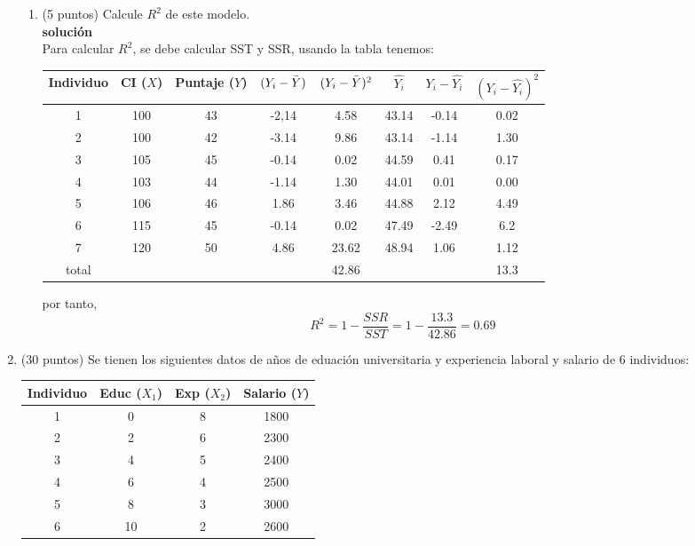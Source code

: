\documentclass[10pt,a4paper]{article}
\begin{document}
\begin{enumerate}
\begin{enumerate}
    \item (5 puntos) Calcule $R^2$ de este modelo.\\
    \textbf{solución}
    \\
    Para calcular $R^2$, se debe calcular SST y SSR, usando la tabla tenemos:
\begin{center}
\begin{tabular}{|c|c|c|c|c|c|c|c|}
\hline
\textbf{Individuo} & \textbf{CI} ($X$) & \textbf{Puntaje} ($Y$)  & $(Y_i - \Bar{Y})$ &$(Y_i - \Bar{Y})^2$ & $\hat{Y_i}$ & $Y_i-\hat{Y_i}$ & $(Y_i-\hat{Y_i})^2$ \\
\hline
1 & 100  & 43 & -2,14 & 4.58 & 43.14 & -0.14  &  0.02\\
2 & 100 & 42  & -3.14 & 9.86 & 43.14 & -1.14 &  1.30\\
3 & 105 & 45  & -0.14 & 0.02 & 44.59 & 0.41  &  0.17\\
4 & 103 & 44  & -1.14 & 1.30 & 44.01 & 0.01  &  0.00\\
5 & 106 & 46  & 1.86  & 3.46 & 44.88 & 2.12  & 4.49 \\
6 & 115 & 45  & -0.14 & 0.02 & 47.49 & -2.49 & 6.2\\
7 & 120 & 50  & 4.86  & 23.62 & 48.94 & 1.06  & 1.12\\
\hline
total & & & & 42.86 &  &  & 13.3 
\end{tabular}
\end{center}   
por tanto,
$$R^2 = 1-\frac{SSR}{SST} = 1-\frac{13.3}{42.86}=0.69$$

\end{enumerate}

\item (30 puntos) Se tienen los siguientes datos de años de eduación universitaria y experiencia laboral y salario de 6 individuos:
\begin{center}
\begin{tabular}{|c|c|c|c|}
\hline
\textbf{Individuo} & \textbf{Educ} ($X_1$) & \textbf{Exp} ($X_2$)  & \textbf{Salario ($Y$)}\\
\hline
1 & 0 &  8 & 1800 \\
2 & 2 &  6 & 2300 \\
3 & 4 &  5 & 2400 \\
4 & 6 &  4 & 2500 \\
5 & 8 &  3 & 3000 \\
6 & 10 & 2 & 2600 \\
\hline
\end{tabular}
\end{center}


\end{enumerate}
\end{document}
